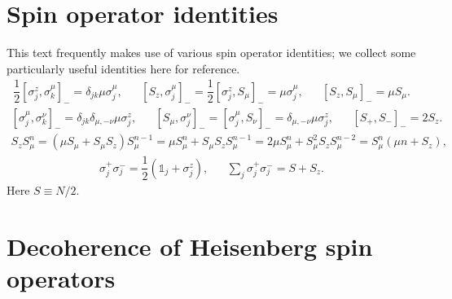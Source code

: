 \documentclass[aps,notitlepage,nofootinbib,11pt]{revtex4-1}
\newcommand{\f}[2]{\dfrac{#1}{#2}} %
\newcommand{\p}[1]{\left(#1\right)} %
\renewcommand{\sp}[1]{\left[#1\right]} %
\newcommand{\1}{\mathds{1}}
\begin{document}


\newpage
\appendix

\section{Spin operator identities}
\label{sec:identities}

This text frequently makes use of various spin operator identities; we
collect some particularly useful identities here for reference.
\begin{align}
  \f12 \sp{\sigma_j^z,\sigma_k^\mu}_- = \delta_{jk} \mu \sigma_j^\mu,
  &&
  \sp{S_z,\sigma_j^\mu}_- = \f12 \sp{\sigma_j^z,S_\mu}_-
  = \mu \sigma_j^\mu,
  &&
  \sp{S_z,S_\mu}_- = \mu S_\mu.
  \label{eq:comm_z_mu}
\end{align}
\begin{align}
  \sp{\sigma_j^\mu,\sigma_k^\nu}_-
  = \delta_{jk} \delta_{\mu,-\nu} \mu \sigma_j^z,
  &&
  \sp{S_\mu,\sigma_j^\nu}_- = \sp{\sigma_j^\mu,S_\nu}_-
  = \delta_{\mu,-\nu} \mu \sigma_j^z,
  &&
  \sp{S_+,S_-}_- = 2 S_z.
  \label{eq:comm_mu_nu}
\end{align}
\begin{align}
  S_z S_\mu^n
  = \p{\mu S_\mu + S_\mu S_z} S_\mu^{n-1}
  = \mu S_\mu^n + S_\mu S_z S_\mu^{n-1}
  = 2\mu S_\mu^n + S_\mu^2 S_z S_\mu^{n-2}
  = S_\mu^n \p{\mu n + S_z},
  \label{eq:comm_z_mu_n}
\end{align}
\begin{align}
  \sigma_j^+ \sigma_j^- = \f12\p{\1_j+\sigma_j^z},
  &&
  \sum_j \sigma_j^+ \sigma_j^- = S + S_z.
\end{align}
Here $S\equiv N/2$.


\section{Decoherence of Heisenberg spin operators}
\label{sec:decoherence}
\end{document}
